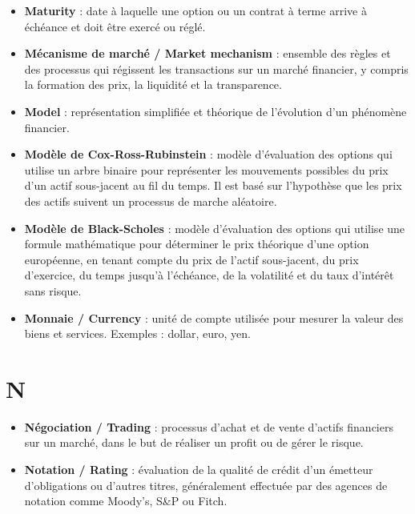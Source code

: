 \documentclass[a4paper,10pt]{article}
\begin{document}
\begin{multicols}{2}
\begin{itemize}
  \item \textbf{Maturity} : date à laquelle une option ou un contrat à terme arrive à échéance et doit être exercé ou réglé.
  \item \textbf{Mécanisme de marché / Market mechanism} : ensemble des règles et des processus qui régissent les transactions sur un marché financier, y compris la formation des prix, la liquidité et la transparence.
  \item \textbf{Model} : représentation simplifiée et théorique de l’évolution d’un phénomène financier.
  \item \textbf{Modèle de Cox-Ross-Rubinstein} : modèle d’évaluation des options qui utilise un arbre binaire pour représenter les mouvements possibles du prix d’un actif sous-jacent au fil du temps. Il est basé sur l’hypothèse que les prix des actifs suivent un processus de marche aléatoire.
  \item \textbf{Modèle de Black-Scholes} : modèle d’évaluation des options qui utilise une formule mathématique pour déterminer le prix théorique d’une option européenne, en tenant compte du prix de l’actif sous-jacent, du prix d’exercice, du temps jusqu’à l’échéance, de la volatilité et du taux d’intérêt sans risque.
  \item \textbf{Monnaie / Currency} : unité de compte utilisée pour mesurer la valeur des biens et services. Exemples : dollar, euro, yen.
\end{itemize}

\section*{N}
\begin{itemize}
  \item \textbf{Négociation / Trading} : processus d’achat et de vente d’actifs financiers sur un marché, dans le but de réaliser un profit ou de gérer le risque.
  \item \textbf{Notation / Rating} : évaluation de la qualité de crédit d’un émetteur d’obligations ou d’autres titres, généralement effectuée par des agences de notation comme Moody’s, S\&P ou Fitch.
\end{itemize}


\end{multicols}
\end{document}
